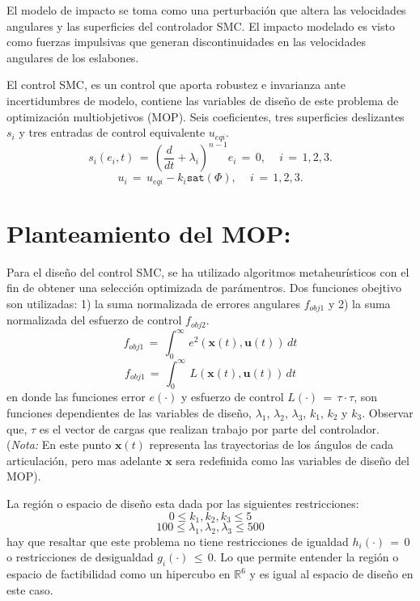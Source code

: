 \documentclass[10pt,onecolumn,twoside,letterpaper]{article}
\begin{document}
\begin{multicols}{2}
\par El modelo de impacto se toma como una perturbaci\'on que altera las velocidades angulares y las superficies del controlador SMC. El impacto modelado es visto como fuerzas impulsivas que generan discontinuidades en las velocidades angulares de los eslabones.
\par El control SMC, es un control que aporta robustez e invarianza ante incertidumbres de modelo, contiene las variables de dise\~no de este problema de optimizaci\'on multiobjetivos (MOP). Seis coeficientes, tres superficies deslizantes $s_i$ y tres entradas de control equivalente $u_{eqi}$.
\begin{equation}
  \label{eq:superficies}
  s_i(e_i,t)\,=\,\left(\frac{d}{dt} + \lambda_i\right)^{n-1}e_i\,=\,0,\mathtt{\quad}\,i\,=\,1,2,3.
\end{equation}
\begin{equation}
  \label{eq:sencontrol}
  u_i\,=\,u_{eqi}-k_i\mathtt{sat}(\Phi),\mathtt{\quad}\,i\,=\,1,2,3.
\end{equation}
\section{Planteamiento del MOP:}
Para el dise\~no del control SMC, se ha utilizado algoritmos metaheur\'isticos con el fin de obtener una selecci\'on optimizada de par\'amentros. Dos funciones obejtivo son utilizadas: 1) la suma normalizada de errores angulares $f_{obj1}$ y 2) la suma normalizada del esfuerzo de control $f_{obj2}$.
\begin{equation}
  \label{eq:f1}
  f_{obj1}\,=\,\int_0^{\infty}\,e^2(\mathbf{x}(t),\mathbf{u}(t))\,dt
\end{equation}
\begin{equation}
  \label{eq:f2}
  f_{obj1}\,=\,\int_0^{\infty}\,L(\mathbf{x}(t),\mathbf{u}(t))\,dt
\end{equation}
en donde las funciones error $e(\cdot)$ y esfuerzo de control $L(\cdot)\,=\,\tau\cdot\tau$, son funciones dependientes de las variables de dise\~no, $\lambda_1$, $\lambda_2$, $\lambda_3$, $k_1$, $k_2$ y $k_3$. Observar que, $\tau$ es el vector de cargas que realizan trabajo por parte del controlador. (\emph{Nota:} En este punto $\mathbf{x}(t)$ representa las trayectorias de los \'angulos de cada articulaci\'on, pero mas adelante $\mathbf{x}$ sera redefinida como las variables de dise\~no del MOP).
\par La regi\'on o espacio de dise\~no esta dada por las siguientes restricciones:
\begin{equation}
  \label{eq:kres}
  0\leq k_1,k_2,k_3\leq 5
\end{equation}
\begin{equation}
  \label{eq:lres}
  100\leq \lambda_1,\lambda_2,\lambda_3\leq 500
\end{equation}
hay que resaltar que este problema no tiene restricciones de igualdad $h_i(\cdot)\,=\,0$ o restricciones de desigualdad $g_i(\cdot)\,\leq\,0$. Lo que permite entender la regi\'on o espacio de factibilidad como un hipercubo en $\mathbb{R}^6$ y es igual al espacio de dise\~no en este caso.

\end{multicols}
\end{document}
